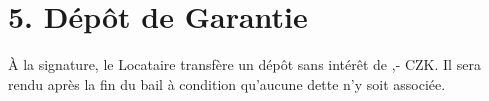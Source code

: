 \section*{5. Dépôt de Garantie}
À la signature, le Locataire transfère un dépôt sans intérêt de \DepositAmount,- CZK. Il sera rendu après la fin du bail à condition qu'aucune dette n'y soit associée.
